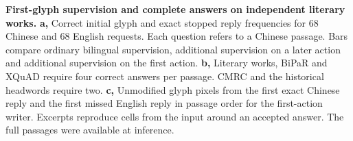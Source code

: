 \textbf{First-glyph supervision and complete answers on independent literary works.}
\textbf{a,} Correct initial glyph and exact stopped reply frequencies for 68 Chinese and 68 English requests. Each question refers to a Chinese passage. Bars compare ordinary bilingual supervision, additional supervision on a later action and additional supervision on the first action. \textbf{b,} Literary works, BiPaR and XQuAD require four correct answers per passage. CMRC and the historical headwords require two. \textbf{c,} Unmodified glyph pixels from the first exact Chinese reply and the first missed English reply in passage order for the first-action writer. Excerpts reproduce cells from the input around an accepted answer. The full passages were available at inference.
